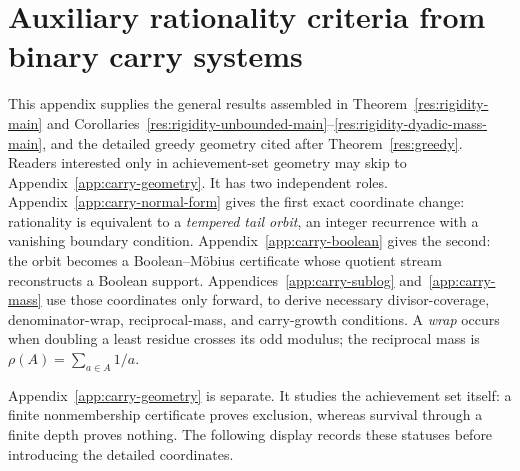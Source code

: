 \documentclass[11pt]{article}
\theoremstyle{definition}
\theoremstyle{remark}
\begin{document}
\section{Auxiliary rationality criteria from binary carry systems}\label{sec:carry}

This appendix supplies the general results assembled in
Theorem~\ref{res:rigidity-main} and
Corollaries~\ref{res:rigidity-unbounded-main}--\ref{res:rigidity-dyadic-mass-main},
and the detailed greedy geometry cited after Theorem~\ref{res:greedy}.
Readers interested only in achievement-set geometry may skip to
Appendix~\ref{app:carry-geometry}.
It has two independent roles.  Appendix~\ref{app:carry-normal-form} gives the
first exact coordinate change: rationality is equivalent to a \emph{tempered
tail orbit}, an integer recurrence with a vanishing boundary condition.
Appendix~\ref{app:carry-boolean} gives the second: the orbit becomes a
Boolean--M\"obius certificate whose quotient stream reconstructs a Boolean support.
Appendices~\ref{app:carry-sublog} and~\ref{app:carry-mass} use those coordinates
only forward, to derive necessary divisor-coverage, denominator-wrap,
reciprocal-mass, and carry-growth conditions.  A \emph{wrap} occurs when
doubling a least residue crosses its odd modulus; the reciprocal mass is
\(\rho(A)=\sum_{a\in A}1/a\).

Appendix~\ref{app:carry-geometry} is separate.  It studies the achievement
set itself: a finite nonmembership certificate proves exclusion, whereas survival
through a finite depth proves nothing.  The following display records these
statuses before introducing the detailed coordinates.
\end{document}
